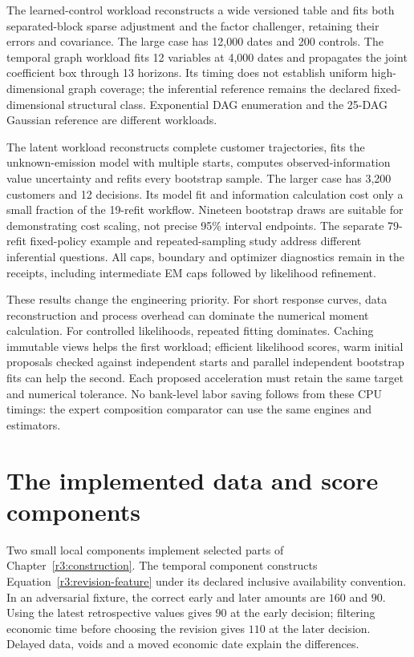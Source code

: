 The learned-control workload reconstructs a wide versioned table and fits
both separated-block sparse adjustment and the factor challenger, retaining
their errors and covariance. The large case has 12,000 dates and 200 controls.
The temporal graph workload fits 12 variables at 4,000 dates and propagates
the joint coefficient box through 13 horizons. Its timing does not establish
uniform high-dimensional graph coverage; the inferential reference remains
the declared fixed-dimensional structural class. Exponential DAG enumeration
and the 25-DAG Gaussian reference are different workloads.

The latent workload reconstructs complete customer trajectories, fits the
unknown-emission model with multiple starts, computes observed-information
value uncertainty and refits every bootstrap sample. The larger case has
3,200 customers and 12 decisions. Its model fit and information calculation
cost only a small fraction of the 19-refit workflow. Nineteen bootstrap
draws are suitable for demonstrating cost scaling, not precise 95\% interval
endpoints. The separate 79-refit fixed-policy example and repeated-sampling
study address different inferential questions. All caps, boundary and
optimizer diagnostics remain in the receipts, including intermediate EM
caps followed by likelihood refinement.

These results change the engineering priority. For short response curves,
data reconstruction and process overhead can dominate the numerical moment
calculation. For controlled likelihoods, repeated fitting dominates.
Caching immutable views helps the first workload; efficient likelihood
scores, warm initial proposals checked against independent starts and
parallel independent bootstrap fits can help the second. Each proposed
acceleration must retain the same target and numerical tolerance. No
bank-level labor saving follows from these CPU timings: the expert
composition comparator can use the same engines and estimators.




\section{The implemented data and score components}
\label{r3:component-evidence}

Two small local components implement selected parts of
Chapter~\ref{r3:construction}. The temporal component constructs
Equation~\eqref{r3:revision-feature} under its declared inclusive
availability convention. In an adversarial fixture, the correct
early and later amounts are $160$ and $90$. Using the latest
retrospective values gives $90$ at the early decision; filtering
economic time before choosing the revision gives $110$ at the later
decision. Delayed data, voids and a moved economic date explain the
differences.

